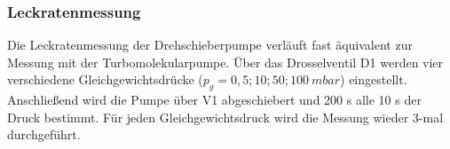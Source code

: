 \subsubsection{Leckratenmessung}
\label{sec:Leckratenmessung2}
Die Leckratenmessung der Drehschieberpumpe verläuft fast äquivalent zur Messung mit der Turbomolekularpumpe.
Über das Drosselventil D1 werden vier verschiedene Gleichgewichtsdrücke ($p_g = 0,5; 10; 50; 100\: mbar$) eingestellt.
Anschließend wird die Pumpe über V1 abgeschiebert und 200 s alle 10 s der Druck bestimmt. Für jeden Gleichgewichtsdruck 
wird die Messung wieder 3-mal durchgeführt.


